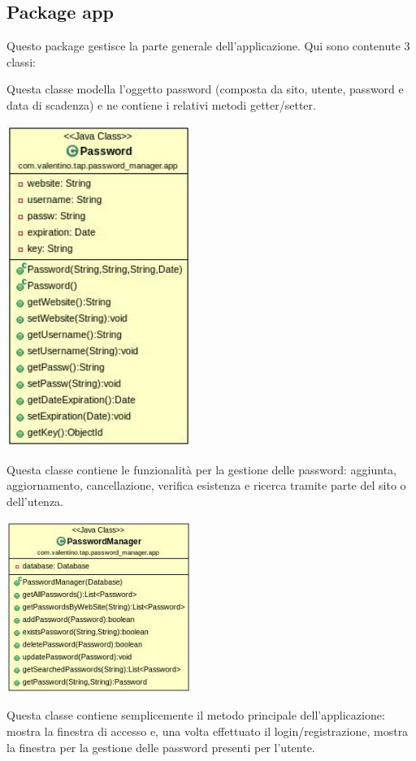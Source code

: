 \subsection{Package app}
Questo package gestisce la parte generale dell'applicazione. Qui sono contenute 3 classi:
\begin{myitemize}{}
	\item[\class{Password}] Questa classe modella l'oggetto password (composta da sito, utente, password e data di scadenza) e ne contiene i relativi metodi getter/setter.
		\begin{center} \includegraphics[width=6cm]{Immagini/Password.jpg} \end{center}
	\item[\class{PasswordManager}] Questa classe contiene le funzionalità per la gestione delle password: aggiunta, aggiornamento, cancellazione, verifica esistenza e ricerca tramite parte del sito o dell'utenza.
		\begin{center} \includegraphics[width=6cm]{Immagini/PasswordManager.jpg} \end{center}		
	
	\item[\class{Application}] Questa classe contiene semplicemente il metodo principale dell'applicazione: mostra la finestra di accesso e, una volta effettuato il login/registrazione, mostra la finestra per la gestione delle password presenti per l'utente.
\end{myitemize}

